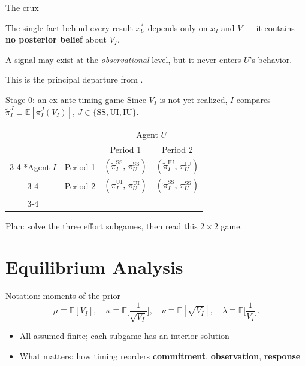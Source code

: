 \documentclass[10pt]{beamer}
\let\focusoldcitet\citet
\renewcommand{\citet}[1]{\textcolor{alert}{\focusoldcitet{#1}}}%
\newcommand{\E}{\mathbb{E}}
\newcommand{\pt}{\widetilde{\pi}}
\newcommand{\rSS}{\mathrm{SS}}
\newcommand{\rUI}{\mathrm{UI}}
\newcommand{\rIU}{\mathrm{IU}}
\newcommand{\timinggametable}[4]{%
  \begin{table}[H]
    \setlength{\extrarowheight}{3pt}
    \centering
    \begin{tabular}{cc|c|c|}
      & \multicolumn{1}{c}{} & \multicolumn{2}{c}{Agent $U$}\\
      & \multicolumn{1}{c}{} & \multicolumn{1}{c}{Period 1} & \multicolumn{1}{c}{Period 2} \\\cline{3-4}
      \multirow{2}*{Agent $I$} & Period 1 & #1 & #2 \\\cline{3-4}
      & Period 2 & #3 & #4 \\\cline{3-4}
    \end{tabular}
  \end{table}%
}
\begin{document}
\begin{frame}{The crux}
  \begin{alertblock}{The single fact behind every result}
    $x_U^{*}$ depends only on $x_I$ and $V$ --- it contains
    \textbf{no posterior belief} about $V_I$.
  \end{alertblock}

  A signal may exist at the \emph{observational} level, but it never
  enters $U$'s behavior.

  \vspace{0.4em}
  This is the principal departure from \citet{fu2006}.
\end{frame}

\begin{frame}{Stage-0: an ex ante timing game}
  Since $V_I$ is not yet realized, $I$ compares
  $\pt_I^{J} \equiv \E\!\left[\pi_I^{J}(V_I)\right]$,
  $J \in \{\rSS, \rUI, \rIU\}$.

  \timinggametable
    {$(\pt_I^{\rSS},\,\pi_U^{\rSS})$}
    {$(\pt_I^{\rIU},\,\pi_U^{\rIU})$}
    {$(\pt_I^{\rUI},\,\pi_U^{\rUI})$}
    {$(\pt_I^{\rSS},\,\pi_U^{\rSS})$}

  \vspace{0.4em}
  Plan: solve the three effort subgames, then read this $2\times 2$ game.
\end{frame}

\section{Equilibrium Analysis}

\begin{frame}{Notation: moments of the prior}
  \begin{equation}
    \mu \equiv \E[V_I], \quad
    \kappa \equiv \E\!\Big[\dfrac{1}{\sqrt{V_I}}\Big], \quad
    \nu \equiv \E[\sqrt{V_I}], \quad
    \lambda \equiv \E\!\Big[\dfrac{1}{V_I}\Big].
  \end{equation}

  \begin{itemize}
    \item All assumed finite; each subgame has an interior solution
    \item What matters: how timing reorders \textbf{commitment},
          \textbf{observation}, \textbf{response}
  \end{itemize}
\end{frame}
\end{document}
